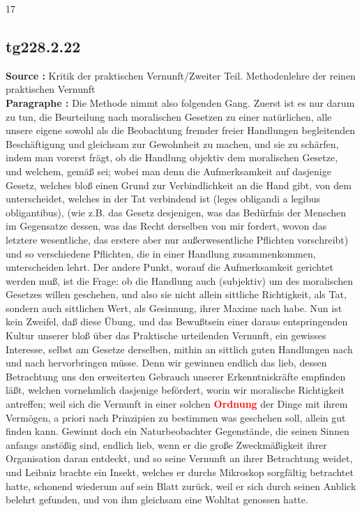 \documentclass[a4paper,12pt,twoside]{book}
\newcommand{\match}[1]{\textcolor{red}{\textbf{#1}}}
\begin{document}
	
	17
	
	
	
	\subsection*{tg228.2.22} 
	\textbf{Source : }Kritik der praktischen Vernunft/Zweiter Teil. Methodenlehre der reinen praktischen Vernunft\\  
	
	\noindent\textbf{Paragraphe : }Die Methode nimmt also folgenden Gang. Zuerst ist es nur darum zu tun, die Beurteilung nach moralischen Gesetzen zu einer natürlichen, alle unsere eigene sowohl als die Beobachtung fremder freier Handlungen begleitenden Beschäftigung und gleichsam zur Gewohnheit zu machen, und sie zu schärfen, indem man vorerst frägt, ob die Handlung objektiv dem moralischen Gesetze, und welchem, gemäß sei; wobei man denn die Aufmerksamkeit auf dasjenige Gesetz, welches bloß einen Grund zur Verbindlichkeit an die Hand gibt, von dem unterscheidet, welches in der Tat verbindend ist (leges obligandi a legibus obligantibus), (wie z.B. das Gesetz desjenigen, was das Bedürfnis der Menschen im Gegensatze dessen, was das Recht derselben von mir fordert, wovon das letztere wesentliche, das erstere aber nur außerwesentliche Pflichten vorschreibt) und so verschiedene Pflichten, die in einer Handlung zusammenkommen, unterscheiden lehrt. Der andere Punkt, worauf die Aufmerksamkeit gerichtet werden muß, ist die Frage: ob die Handlung auch (subjektiv) um des moralischen Gesetzes willen geschehen, und also sie nicht allein sittliche Richtigkeit, als Tat, sondern auch sittlichen Wert, als Gesinnung, ihrer Maxime nach habe. Nun ist kein Zweifel, daß diese Übung, und das Bewußtsein einer daraus entspringenden Kultur unserer bloß über das Praktische urteilenden Vernunft, ein gewisses Interesse, selbst am Gesetze derselben, mithin an sittlich guten Handlungen nach und nach hervorbringen müsse. Denn wir gewinnen endlich das lieb, dessen Betrachtung uns den erweiterten Gebrauch unserer Erkenntniskräfte empfinden läßt, welchen vornehmlich dasjenige befördert, worin wir moralische Richtigkeit antreffen; weil sich die Vernunft in einer solchen \match{Ordnung} der Dinge mit ihrem Vermögen, a priori nach Prinzipien zu bestimmen was geschehen soll, allein gut finden kann. Gewinnt doch ein Naturbeobachter Gegenstände, die seinen Sinnen anfangs anstößig sind, endlich lieb, wenn er die große Zweckmäßigkeit ihrer Organisation daran entdeckt,  und so seine Vernunft an ihrer Betrachtung weidet, und Leibniz brachte ein Insekt, welches er durchs Mikroskop sorgfältig betrachtet hatte, schonend wiederum auf sein Blatt zurück, weil er sich durch seinen Anblick belehrt gefunden, und von ihm gleichsam eine Wohltat genossen hatte. 
	
\end{document}
